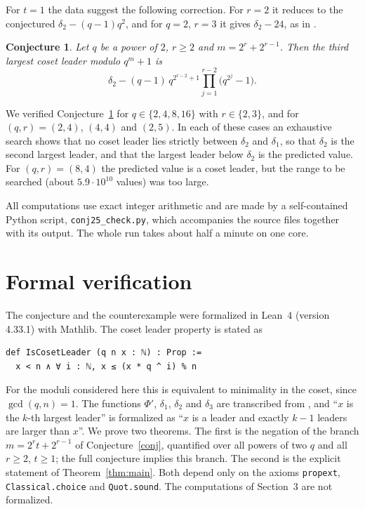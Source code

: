 \documentclass[11pt]{amsart}
\newtheorem{conjecture}[theorem]{Conjecture}
\theoremstyle{remark}
\begin{document}
For $t=1$ the data suggest the following correction.
For $r=2$ it reduces to the conjectured $\delta_2-(q-1)q^2$, and for $q=2$, $r=3$ it gives $\delta_2-24$, as in \cite[Theorem~5.2]{LLFLR}.

\begin{conjecture}\label{conj:fix}
Let $q$ be a power of $2$, $r\ge 2$ and $m=2^r+2^{r-1}$.
Then the third largest coset leader modulo $q^m+1$ is
\[
\delta_2-(q-1)\,q^{2^{r-2}+1}\prod_{j=1}^{r-2}\bigl(q^{2^j}-1\bigr).
\]
\end{conjecture}

We verified Conjecture~\ref{conj:fix} for $q\in\{2,4,8,16\}$ with $r\in\{2,3\}$, and for $(q,r)=(2,4)$, $(4,4)$ and $(2,5)$.
In each of these cases an exhaustive search shows that no coset leader lies strictly between $\delta_2$ and $\delta_1$, so that $\delta_2$ is the second largest leader, and that the largest leader below $\delta_2$ is the predicted value.
For $(q,r)=(8,4)$ the predicted value is a coset leader, but the range to be searched (about $5.9\cdot10^{10}$ values) was too large.

All computations use exact integer arithmetic and are made by a self-contained Python script, \texttt{conj25\_check.py}, which accompanies the source files together with its output.
The whole run takes about half a minute on one core.

\section{Formal verification}

The conjecture and the counterexample were formalized in Lean~4 (version 4.33.1) with Mathlib.
The coset leader property is stated as
\begin{Verbatim}[fontsize=\small,frame=single]
def IsCosetLeader (q n x : ℕ) : Prop :=
  x < n ∧ ∀ i : ℕ, x ≤ (x * q ^ i) % n
\end{Verbatim}
For the moduli considered here this is equivalent to minimality in the coset, since $\gcd(q,n)=1$.
The functions $\Phi'$, $\delta_1$, $\delta_2$ and $\delta_3$ are transcribed from \cite[Sect.~5.2]{LLGS}, and ``$x$ is the $k$-th largest leader'' is formalized as ``$x$ is a leader and exactly $k-1$ leaders are larger than $x$''.
We prove two theorems.
The first is the negation of the branch $m=2^rt+2^{r-1}$ of Conjecture~\ref{conj}, quantified over all powers of two $q$ and all $r\ge2$, $t\ge1$; the full conjecture implies this branch.
The second is the explicit statement of Theorem~\ref{thm:main}.
Both depend only on the axioms \texttt{propext}, \texttt{Classical.choice} and \texttt{Quot.sound}.
The computations of Section~3 are not formalized.
\end{document}
